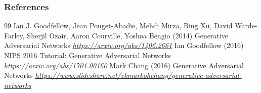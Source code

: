 \documentclass[11pt,compress,t,notes=noshow, xcolor=table]{beamer}
\begin{document}
\begin{vbframe}
\frametitle{References}
\footnotesize{
\begin{thebibliography}{99}
 Ian J. Goodfellow, Jean Pouget-Abadie, Mehdi Mirza, Bing Xu, David Warde-Farley, Sherjil Ozair, Aaron Courville, Yoshua Bengio (2014)
\newblock Generative Adversarial Networks
\newblock \emph{\url{https://arxiv.org/abs/1406.2661}}
 Ian Goodfellow (2016)
\newblock NIPS 2016 Tutorial: Generative Adversarial Networks
\newblock \emph{\url{https://arxiv.org/abs/1701.00160}}
 Mark Chang (2016)
\newblock Generative Adversarial Networks
\newblock \emph{\url{https://www.slideshare.net/ckmarkohchang/generative-adversarial-networks}}


\end{thebibliography}
}
\end{vbframe}

\endlecture
\end{document}
